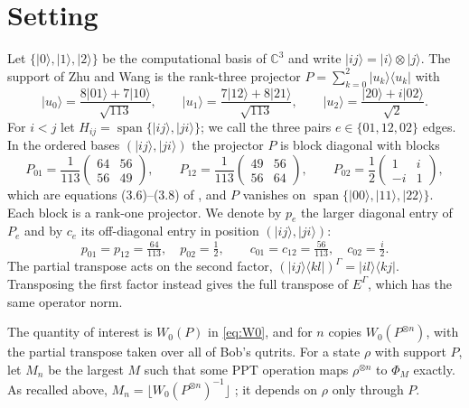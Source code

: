 \documentclass[11pt,a4paper]{article}
\theoremstyle{definition}
\theoremstyle{plain}
\newcommand{\ket}[1]{\lvert#1\rangle}
\newcommand{\bra}[1]{\langle#1\rvert}
\newcommand{\C}{\mathbb{C}}
\begin{document}
\section{Setting}\label{sec:setting}
Let $\{\ket0,\ket1,\ket2\}$ be the computational basis of $\C^3$ and write
$\ket{ij}=\ket i\otimes\ket j$. The support of Zhu and Wang
\cite[Sec.~3]{ZhuWang2026} is the rank-three projector
$P=\sum_{k=0}^2\ket{u_k}\bra{u_k}$ with
\begin{equation}\label{eq:support}
\ket{u_0}=\frac{8\ket{01}+7\ket{10}}{\sqrt{113}},\qquad
\ket{u_1}=\frac{7\ket{12}+8\ket{21}}{\sqrt{113}},\qquad
\ket{u_2}=\frac{\ket{20}+i\ket{02}}{\sqrt2}.
\end{equation}
For $i<j$ let $H_{ij}=\operatorname{span}\{\ket{ij},\ket{ji}\}$; we call the
three pairs $e\in\{01,12,02\}$ edges. In the ordered bases
$(\ket{ij},\ket{ji})$ the projector $P$ is block diagonal with blocks
\begin{equation}\label{eq:blocks}
P_{01}=\frac1{113}\begin{pmatrix}64&56\\56&49\end{pmatrix},\qquad
P_{12}=\frac1{113}\begin{pmatrix}49&56\\56&64\end{pmatrix},\qquad
P_{02}=\frac12\begin{pmatrix}1&i\\-i&1\end{pmatrix},
\end{equation}
which are equations (3.6)--(3.8) of \cite{ZhuWang2026}, and $P$ vanishes on
$\operatorname{span}\{\ket{00},\ket{11},\ket{22}\}$. Each block is a rank-one
projector. We denote by $p_e$ the larger diagonal entry of $P_e$ and by $c_e$
its off-diagonal entry in position $(\ket{ij},\ket{ji})$:
\[
p_{01}=p_{12}=\tfrac{64}{113},\quad p_{02}=\tfrac12,\qquad
c_{01}=c_{12}=\tfrac{56}{113},\quad c_{02}=\tfrac i2 .
\]
The partial transpose acts on the second factor,
$(\ket{ij}\bra{kl})^\Gamma=\ket{il}\bra{kj}$. Transposing the first factor
instead gives the full transpose of $E^\Gamma$, which has the same operator
norm.

The quantity of interest is $W_0(P)$ in \eqref{eq:W0}, and for $n$ copies
$W_0(P^{\otimes n})$, with the partial transpose taken over all of Bob's
qutrits. For a state $\rho$ with support $P$, let $M_n$ be the largest $M$
such that some PPT operation maps $\rho^{\otimes n}$ to $\Phi_M$ exactly. As
recalled above, $M_n=\lfloor W_0(P^{\otimes n})^{-1}\rfloor$
\cite{WangDuan2016,ZhuWang2026}; it depends on $\rho$ only through $P$.
\end{document}

